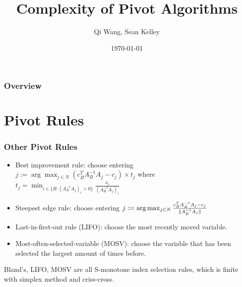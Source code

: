\documentclass{beamer}
\title[Short title]{Complexity of Pivot Algorithms} %
\author{Qi Wang, Sean Kelley} %
\date{\today} %
\DeclarePairedDelimiter{\norm}{\lVert}{\rVert}
\begin{document}
\begin{frame}
\titlepage %
\end{frame}

\begin{frame}
\frametitle{Overview} %
\tableofcontents %
\end{frame}


\section{Pivot Rules} %
\begin{frame}
\frametitle{Other Pivot Rules}
\begin{itemize}
\item Best improvement rule: choose entering $j := \arg \max_{j\in N}(c_B^T A_B^{-1} A_j - c_j)\times t_j$ where $t_j = \min_{i \in \{B:(A_B^{-1}A_j)_{i} >0\}} \frac{x_i}{(A_B^{-1}A_j)_{i}}$
\item Steepest edge rule: choose entering $j: = \arg\max_{j \in N} \frac{c_B^TA_B^{-1}A_j - c_j}{\norm{A_B^{-1}A_j}}$
\item Last-in-first-out rule (LIFO): choose the most recently moved variable.
\item Most-often-selected-variable (MOSV): choose the variable that has been selected the largest amount of times before.
\end{itemize}
Bland's, LIFO, MOSV are all S-monotone index selection rules, which is finite with simplex method and criss-cross.
\end{frame}
\end{document}

